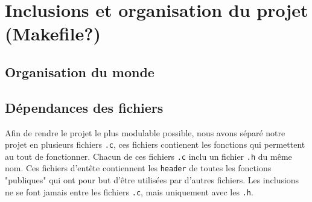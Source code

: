 \section{Inclusions et organisation du projet (Makefile?)}

    \subsection{Organisation du monde}
    \subsection{Dépendances des fichiers}\label{part:graph_src}
        Afin de rendre le projet le plus modulable possible, nous avons séparé notre projet en plusieurs fichiers \texttt{.c}, ces fichiers contienent les fonctions qui permettent au tout de fonctionner. Chacun de ces fichiers \texttt{.c} inclu un fichier \texttt{.h} du même nom. Ces fichiers d'entête contiennent les \texttt{header} de toutes les fonctions "publiques" qui ont pour but d'être utilisées par d'autres fichiers. Les inclusions ne se font jamais entre les fichiers \texttt{.c}, mais uniquement avec les \texttt{.h}.
        
